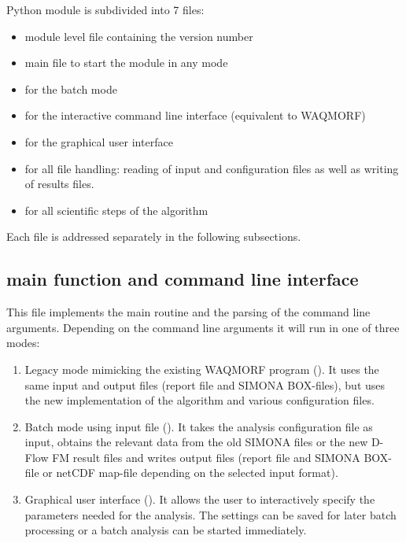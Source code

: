 \dfastmi Python module is subdivided into 7 files:

\begin{itemize}
\item {} module level file containing the version number
\item {} main file to start the module in any mode
\item {} for the batch mode
\item {} for the interactive command line interface (equivalent to WAQMORF)
\item {} for the graphical user interface
\item {} for all file handling: reading of input and configuration files as well as writing of results files.
\item {} for all scientific steps of the algorithm
\end{itemize}

Each file is addressed separately in the following subsections.

\subsection{main function and command line interface }

This file implements the main routine and the parsing of the command line arguments.
Depending on the command line arguments it will run in one of three modes:

\begin{enumerate}
\item Legacy mode mimicking the existing WAQMORF program ().
It uses the same input and output files (report file and SIMONA BOX-files), but uses the new implementation of the algorithm and various configuration files.
\item Batch mode using input file ().
It takes the analysis configuration file as input, obtains the relevant data from the old SIMONA files or the new D-Flow FM result files and writes output files (report file and SIMONA BOX-file or netCDF map-file depending on the selected input format).
\item Graphical user interface ().
It allows the user to interactively specify the parameters needed for the analysis. The settings can be saved for later batch processing or a batch analysis can be started immediately.
\end{enumerate}

